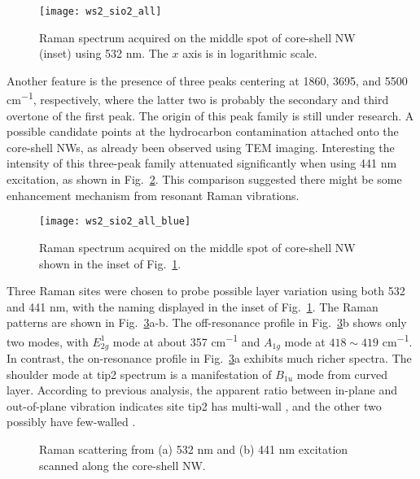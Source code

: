 \begin{figure}[htb]
\centering
\texttt{[image: ws2\_sio2\_all]}
\caption[Raman spectrum of - on -Si 1]{Raman spectrum acquired on the middle spot of core-shell NW (inset) using 532 nm. The $x$ axis is in logarithmic scale.}
\label{fig:ws2ramall}
\end{figure}

Another feature is the presence of three peaks centering at 1860, 3695, and 5500 \si{cm^{-1}}, respectively, where the latter two is probably the secondary and third overtone of the first peak. The origin of this peak family is still under research. A possible candidate points at the hydrocarbon contamination attached onto the core-shell NWs, as already been observed using TEM imaging. Interesting the intensity of this three-peak family attenuated significantly when using 441 nm excitation, as shown in Fig.~\ref{fig:ws2ramblue}. This comparison suggested there might be some enhancement mechanism from  resonant Raman vibrations. 

\begin{figure}[htb]
\centering
\texttt{[image: ws2\_sio2\_all\_blue]}
\caption[Raman spectrum of - on -Si 2]{Raman spectrum acquired on the middle spot of core-shell NW shown in the inset of Fig.~\ref{fig:ws2ramall}.}
\label{fig:ws2ramblue}
\end{figure}

Three Raman sites were chosen to probe possible layer variation using both 532 and 441 nm, with the naming displayed in the inset of Fig.~\ref{fig:ws2ramall}. The Raman patterns are shown in Fig.~\ref{fig:ws2ram3site}a-b. The off-resonance profile in Fig.~\ref{fig:ws2ram3site}b shows only two modes, with $E_{2g}^1$ mode at about 357 \si{cm^{-1}} and $A_{1g}$ mode at $418\sim419$ \si{cm^{-1}}. In contrast, the on-resonance profile in Fig.~\ref{fig:ws2ram3site}a exhibits much richer spectra. The shoulder mode at tip2 spectrum is a manifestation of $B_{1u}$ mode from curved  layer. According to previous analysis, the apparent ratio between in-plane and out-of-plane vibration indicates site tip2 has multi-wall , and the other two possibly have few-walled . 

\begin{figure}[htb]
\centering
{}\hspace{0.04\textwidth}
\caption[Raman spectrum of - on -Si 3]{Raman scattering from (a) 532 nm and (b) 441 nm excitation scanned along the core-shell NW.}
\label{fig:ws2ram3site}
\end{figure}


